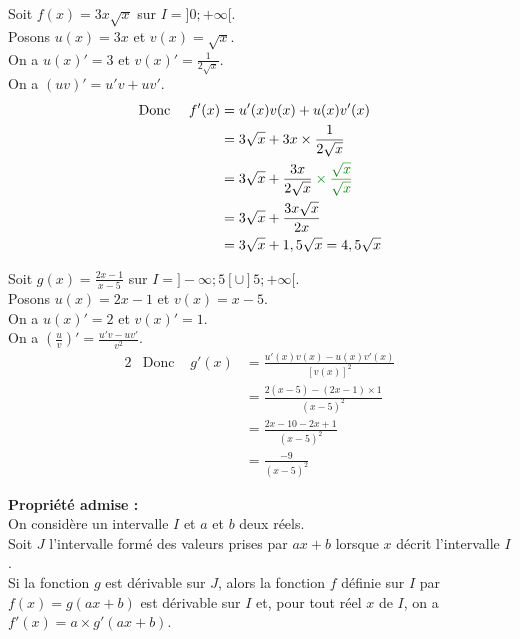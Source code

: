 \documentclass[11pt,a4paper]{article}
\begin{document}
\begin{minipage}[t]{0.5\textwidth}
    Soit $f(x)=3x\sqrt{x}$ sur $I=]0;+\infty[$. \\

    Posons $u(x)=3x$ et $v(x)=\sqrt{x}$. \\
    On a $u(x)'=3$ et $v(x)'=\frac{1}{2\sqrt{x}}$. \\
    On a $(uv)'=u'v+uv'$.
    \begin{alignat*}{2}
         & \text{Donc } & f'(x) & =u'(x)v(x)+u(x)v'(x)                                                                 \\
         &              &       & = 3\sqrt{x}+3x\times \frac{1}{2\sqrt{x}}                                             \\
         &              &       & = 3\sqrt{x}+\frac{3x}{2\sqrt{x}} \color{dark_green} \times \frac{\sqrt{x}}{\sqrt{x}} \\
         &              &       & = 3\sqrt{x}+ \frac{3x\sqrt{x}}{2x}                                                   \\
         &              &       & = 3\sqrt{x}+1,5\sqrt{x}=4,5\sqrt{x}
    \end{alignat*}
\end{minipage}
\hfill
\begin{minipage}[t]{0.5\textwidth}
    Soit $g(x)=\frac{2x-1}{x-5}$ sur $I=]-\infty; 5[\cup]5; +\infty[$. \\

    Posons $u(x)=2x-1$ et $v(x)=x-5$. \\
    On a $u(x)'=2$ et $v(x)'=1$. \\
    On a $\displaystyle\left(\frac{u}{v}\right)'=\frac{u'v-uv'}{v^2}$.
    \begin{alignat*}{2}
         & \text{Donc } & g'(x) & =\frac{u'(x)v(x)-u(x)v'(x)}{[v(x)]^2} \\
         &              &       & =\frac{2(x-5)-(2x-1)\times1}{(x-5)^2} \\
         &              &       & =\frac{2x-10-2x+1}{(x-5)^2}           \\
         &              &       & =\frac{-9}{(x-5)^2}
    \end{alignat*}
\end{minipage}


\begin{mdframed}[style=proprieteStyle]
    \textbf{Propriété admise :} ~\\
    On considère un intervalle $I$ et $a$ et $b$ deux réels.\\
    Soit $J$ l'intervalle formé des valeurs prises par $ax+b$ lorsque $x$ décrit l'intervalle $I$.\\
    Si la fonction $g$ est dérivable sur $J$, alors la fonction $f$ définie sur $I$ par $f(x)=g(ax+b)$ est dérivable sur $I$ et, pour tout réel $x$ de $I$, on a $f'(x)=a\times g'(ax+b)$.
\end{mdframed}
\end{document}
